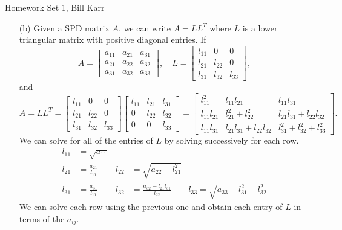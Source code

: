 \documentclass[10pt]{article}
\begin{document}
%
{Homework Set 1, Bill Karr}


\begin{enumerate}[(a)]

\item[(b)] Given a SPD matrix $A$, we can write $ A = L L^T $ where $L$ is a lower triangular matrix with positive diagonal entries. If $$A = \begin{bmatrix}
a_{11} & a_{21}  & a_{31} \\
a_{21} & a_{22} & a_{32} \\
a_{31} & a_{32} & a_{33}
\end{bmatrix}, \quad
L = \begin{bmatrix}
l_{11} & 0  & 0 \\
l_{21} & l_{22} & 0 \\
l_{31} & l_{32} & l_{33}
\end{bmatrix},
$$ and $$
A = L L^T = \begin{bmatrix}
l_{11} & 0  & 0 \\
l_{21} & l_{22} & 0 \\
l_{31} & l_{32} & l_{33}
\end{bmatrix} \begin{bmatrix}
l_{11} & l_{21} & l_{31} \\
0 & l_{22} & l_{32} \\
0 & 0 & l_{33}
\end{bmatrix} = \begin{bmatrix}
l_{11}^2 & l_{11} l_{21} & l_{11} l_{31} \\
l_{11} l_{21} & l_{21}^2 + l_{22}^2 & l_{21} l_{31} + l_{22} l_{32} \\
l_{11} l_{31}  & l_{21} l_{31} + l_{22} l_{32} & l_{31}^2 + l_{32}^2 + l_{33}^2
\end{bmatrix}.
$$ We can solve for all of the entries of $L$ by solving successively for each row. \begin{align*}
l_{11} &= \sqrt{a_{11}} &  & \\
l_{21} &= \frac{a_{21}}{l_{11}}  & l_{22} &= \sqrt{a_{22} - l_{21}^2} & \\
l_{31} &= \frac{a_{31}}{l_{11}} & l_{32} &= \frac{a_{32} - l_{21} l_{31} }{l_{22}} & l_{33} = \sqrt{a_{33} - l_{31}^2 - l_{32}^2 }
\end{align*} We can solve each row using the previous one and obtain each entry of $L$ in terms of the $ a_{ij} $. 


\end{enumerate}
\end{document}

